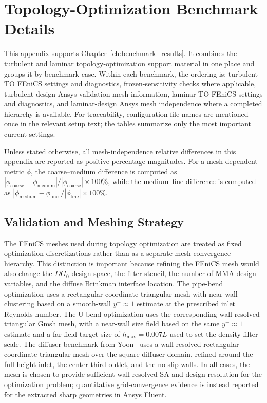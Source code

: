 \chapter{Topology-Optimization Benchmark Details}
\label{app:C_topology_optimization_benchmarks}
\label{app:C_laminar_turbulent_topology_comparison}

This appendix supports Chapter~\ref{ch:benchmark_results}. It combines the turbulent and laminar topology-optimization support material in one place and groups it by benchmark case. Within each benchmark, the ordering is: turbulent-TO FEniCS settings and diagnostics, frozen-sensitivity checks where applicable, turbulent-design Ansys validation-mesh information, laminar-TO FEniCS settings and diagnostics, and laminar-design Ansys mesh independence where a completed hierarchy is available. For traceability, configuration file names are mentioned once in the relevant setup text; the tables summarize only the most important current settings.

Unless stated otherwise, all mesh-independence relative differences in this appendix are reported as positive percentage magnitudes. For a mesh-dependent metric $\phi$, the coarse--medium difference is computed as $|\phi_{\mathrm{coarse}}-\phi_{\mathrm{medium}}|/|\phi_{\mathrm{coarse}}|\times100\%$, while the medium--fine difference is computed as $|\phi_{\mathrm{medium}}-\phi_{\mathrm{fine}}|/|\phi_{\mathrm{fine}}|\times100\%$.

\section{Validation and Meshing Strategy}
\label{sec:app_B_mesh_strategy}
The FEniCS meshes used during topology optimization are treated as fixed optimization discretizations rather than as a separate mesh-convergence hierarchy. This distinction is important because refining the FEniCS mesh would also change the $DG_0$ design space, the filter stencil, the number of MMA design variables, and the diffuse Brinkman interface location. The pipe-bend optimization uses a rectangular-coordinate triangular mesh with near-wall clustering based on a smooth-wall $y^+\approx1$ estimate at the prescribed inlet Reynolds number. The U-bend optimization uses the corresponding wall-resolved triangular Gmsh mesh, with a near-wall size field based on the same $y^+\approx1$ estimate and a far-field target size of $h_{\max}=0.007L$ used to set the density-filter scale. The diffuser benchmark from Yoon~\cite{Yoon2016} uses a wall-resolved rectangular-coordinate triangular mesh over the square diffuser domain, refined around the full-height inlet, the center-third outlet, and the no-slip walls. In all cases, the mesh is chosen to provide sufficient wall-resolved SA and design resolution for the optimization problem; quantitative grid-convergence evidence is instead reported for the extracted sharp geometries in Ansys Fluent.

